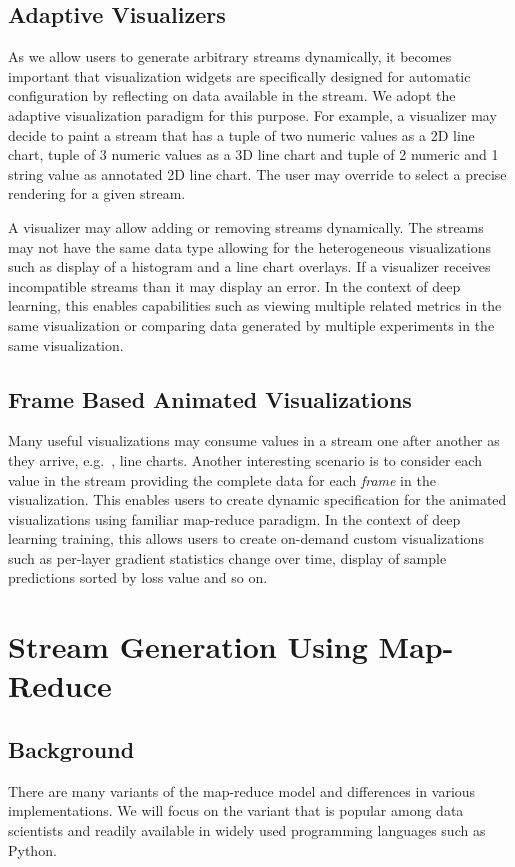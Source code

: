 \documentclass[sigchi]{acmart}
\begin{document}
\subsection{Adaptive Visualizers}
As we allow users to generate arbitrary streams dynamically, it becomes important that visualization widgets are specifically designed for automatic configuration by reflecting on data available in the stream. We adopt the adaptive visualization paradigm\cite{Nazemi2016, mourlas2009intelligent} for this purpose. For example, a visualizer may decide to paint a stream that has a tuple of two numeric values as a 2D line chart, tuple of 3 numeric values as a 3D line chart and tuple of 2 numeric and 1 string value as annotated 2D line chart. The user may override to select a precise rendering for a given stream.

A visualizer may allow adding or removing streams dynamically. The streams may not have the same data type allowing for the heterogeneous visualizations such as display of a histogram and a line chart overlays. If a visualizer receives incompatible streams than it may display an error. In the context of deep learning, this enables capabilities such as viewing multiple related metrics in the same visualization or comparing data generated by multiple experiments in the same visualization.





\subsection{Frame Based Animated Visualizations}
Many useful visualizations may consume values in a stream one after another as they arrive, e.g.\ , line charts. Another interesting scenario is to consider each value in the stream providing the complete data for each \emph{frame} in the visualization. This enables users to create dynamic specification for the animated visualizations using familiar map-reduce paradigm. In the context of deep learning training, this allows users to create on-demand custom visualizations such as per-layer gradient statistics change over time, display of sample predictions sorted by loss value and so on.



\section{Stream Generation Using Map-Reduce}
\subsection{Background}
There are many variants of the map-reduce model\cite{Afrati:2011:MER:1951365.1951367} and differences in various implementations. We will focus on the variant that is popular among data scientists and readily available in widely used programming languages such as Python.
\end{document}
